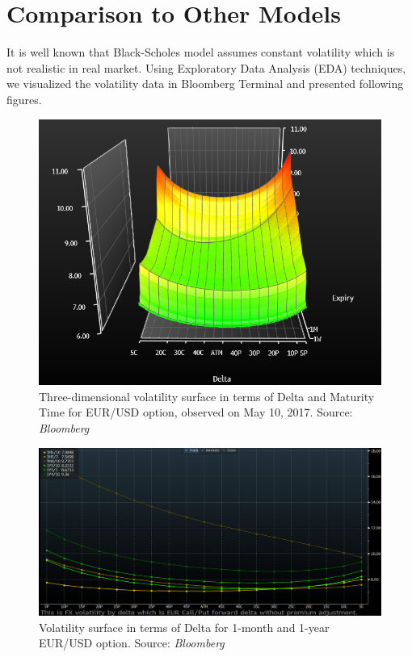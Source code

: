 \chapter{Comparison to Other Models}
It is well known that Black-Scholes model assumes constant volatility which is not realistic in real market. Using Exploratory Data Analysis (EDA) techniques, we visualized the volatility data in Bloomberg Terminal and presented following figures. 

\begin{figure}[htb]
	\centering
	\includegraphics[scale=0.8]{./Testing-data/Heston-prices/VolSurface/EURUSD-Vol.png} 
	\caption{Three-dimensional volatility surface in terms of Delta and Maturity Time for EUR/USD option, observed on May 10, 2017. Source: \textit{Bloomberg}}
	\label{fig:3dvol-label} %
\end{figure}
\begin{figure}[htb]
	\centering
	\includegraphics[scale=0.415]{./Testing-data//Heston-prices/VolSurface/EURUSD-2DVol.png} 
	\caption{Volatility surface in terms of Delta for 1-month and 1-year EUR/USD option. Source: \textit{Bloomberg}}
	\label{fig:2dvol-label} %
\end{figure}
